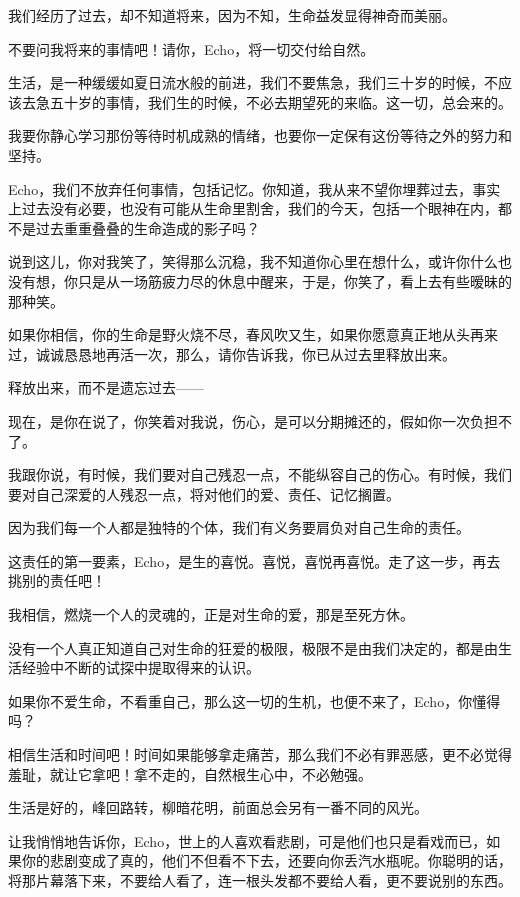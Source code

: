 \par 我们经历了过去，却不知道将来，因为不知，生命益发显得神奇而美丽。
\par 不要问我将来的事情吧！请你，Echo，将一切交付给自然。
\par 生活，是一种缓缓如夏日流水般的前进，我们不要焦急，我们三十岁的时候，不应该去急五十岁的事情，我们生的时候，不必去期望死的来临。这一切，总会来的。
\par 我要你静心学习那份等待时机成熟的情绪，也要你一定保有这份等待之外的努力和坚持。
\par Echo，我们不放弃任何事情，包括记忆。你知道，我从来不望你埋葬过去，事实上过去没有必要，也没有可能从生命里割舍，我们的今天，包括一个眼神在内，都不是过去重重叠叠的生命造成的影子吗？
\par 说到这儿，你对我笑了，笑得那么沉稳，我不知道你心里在想什么，或许你什么也没有想，你只是从一场筋疲力尽的休息中醒来，于是，你笑了，看上去有些暧昧的那种笑。
\par 如果你相信，你的生命是野火烧不尽，春风吹又生，如果你愿意真正地从头再来过，诚诚恳恳地再活一次，那么，请你告诉我，你已从过去里释放出来。
\par 释放出来，而不是遗忘过去——
\par 现在，是你在说了，你笑着对我说，伤心，是可以分期摊还的，假如你一次负担不了。
\par 我跟你说，有时候，我们要对自己残忍一点，不能纵容自己的伤心。有时候，我们要对自己深爱的人残忍一点，将对他们的爱、责任、记忆搁置。
\par 因为我们每一个人都是独特的个体，我们有义务要肩负对自己生命的责任。
\par 这责任的第一要素，Echo，是生的喜悦。喜悦，喜悦再喜悦。走了这一步，再去挑别的责任吧！
\par 我相信，燃烧一个人的灵魂的，正是对生命的爱，那是至死方休。
\par 没有一个人真正知道自己对生命的狂爱的极限，极限不是由我们决定的，都是由生活经验中不断的试探中提取得来的认识。
\par 如果你不爱生命，不看重自己，那么这一切的生机，也便不来了，Echo，你懂得吗？
\par 相信生活和时间吧！时间如果能够拿走痛苦，那么我们不必有罪恶感，更不必觉得羞耻，就让它拿吧！拿不走的，自然根生心中，不必勉强。
\par 生活是好的，峰回路转，柳暗花明，前面总会另有一番不同的风光。
\par 让我悄悄地告诉你，Echo，世上的人喜欢看悲剧，可是他们也只是看戏而已，如果你的悲剧变成了真的，他们不但看不下去，还要向你丢汽水瓶呢。你聪明的话，将那片幕落下来，不要给人看了，连一根头发都不要给人看，更不要说别的东西。
